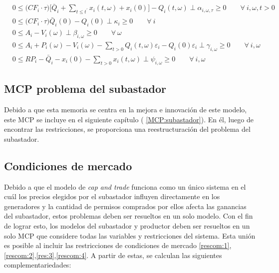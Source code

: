 \begin{footnotesize}
\begin{align}
    & 0 \leq \big(CF_i \cdot \tau \big) \Bigg[\bar{Q}_i + \sum_{t\leq t^{\prime}} x_i(t,\omega) + x_i(0) \Bigg] - Q_i(t,\omega)  \perp \alpha_{i,\omega,\tau} \geq 0 \qquad \forall \ i, \omega, t  > 0\\
    & 0 \leq \Big(CF_i\cdot\tau \Big)\bar{Q}_i(0)-Q_{i}(0) \perp \kappa_i \geq 0 \qquad \forall \ i \\
    & 0 \leq  A_{i} - V_i(\omega) \perp \beta_{i,\omega} \geq 0 \qquad \forall  \ \omega \\
    & 0 \leq  A_{i} + P_{i} (\omega) - V_i(\omega) - \sum_{t>0} Q_i(t,\omega) \varepsilon_{i} -Q_i(0)\varepsilon_{i} \perp \gamma_{i,\omega} \geq 0 \qquad \forall \ i, \omega\\
    & 0 \leq  RP_i - \bar{Q}_i - x_i(0) - \sum_{t>0} x_i(t,\omega) \perp \psi_{i,\omega} \geq 0 \qquad \forall \ i,\omega 
\end{align}

\end{footnotesize}


\subsection{MCP problema del subastador}

Debido a que esta memoria se centra en la mejora e innovación de este modelo, este MCP se incluye en el siguiente capítulo ( \ref{MCP:subastador}). En él, luego de encontrar las restricciones, se proporciona una reestructuración del problema del subastador. 

\subsection{Condiciones de mercado}\label{MCPmercado}

Debido a que el modelo de \textit{cap and trade} funciona como un único sistema en el cuál los precios elegidos por el subastador influyen directamente en los generadores y la cantidad de permisos comprados por ellos afecta las ganancias del subastador, estos problemas deben ser resueltos en un solo modelo. Con el fin de lograr esto, los modelos del subastador y productor deben ser resueltos en un solo MCP que considere todas las variables y restricciones del sistema. Esta unión es posible al incluir las restricciones de condiciones de mercado \ref{rescom:1}, \ref{rescom:2},\ref{res:3},\ref{rescom:4}. A partir de estas, se calculan las siguientes complementariedades:


